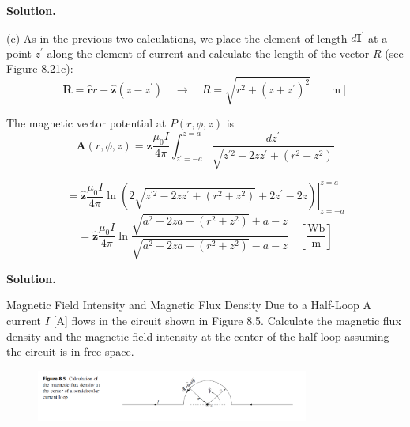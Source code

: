 \documentclass[12pt, a4paper, oneside]{report}
\newenvironment{solution}{
  \par\medskip\noindent
  \textbf{Solution.}\quad\itshape
  \par\noindent\makebox[\linewidth]{\rule{\textwidth}{0.4pt}}
}{
  \par\noindent\makebox[\linewidth]{\rule{\textwidth}{0.4pt}}
  \par\medskip
}
\begin{document}
\begin{solution}
(c) As in the previous two calculations, we place the element of length $d \mathbf{I}^{\prime}$ at a point $z^{\prime}$ along the element of current and calculate the length of the vector $R$ (see Figure 8.21c):
$$
\mathbf{R}=\hat{\mathbf{r}} r-\hat{\mathbf{z}}\left(z-z^{\prime}\right) \quad \rightarrow \quad R=\sqrt{r^2+\left(z+z^{\prime}\right)^2} \quad[\mathrm{~m}]
$$

The magnetic vector potential at $P(r, \phi, z)$ is
$$
\mathbf{A}(r, \phi, z) =\hat{\mathbf{z}} \frac{\mu_0 I}{4 \pi} \int_{z^{\prime}=-a}^{z=a} \frac{d z^{\prime}}{\sqrt{z^{\prime 2}-2 z z^{\prime}+\left(r^2+z^2\right)}}
$$

$$
 =\left.\hat{\mathbf{z}} \frac{\mu_0 I}{4 \pi} \ln \left(2 \sqrt{z^{\prime 2}-2 z z^{\prime}+\left(r^2+z^2\right)}+2 z^{\prime}-2 z\right)\right|_{z=-a} ^{z=a}
 $$
 $$
 =\hat{\mathbf{z}} \frac{\mu_0 I}{4 \pi} \ln \frac{\sqrt{a^2-2 z a+\left(r^2+z^2\right)}+a-z}{\sqrt{a^2+2 z a+\left(r^2+z^2\right)}-a-z} \quad\left[\frac{\mathrm{Wb}}{\mathrm{m}}\right]
$$
\end{solution}


\begin{solution}
Magnetic Field Intensity and Magnetic Flux Density Due to a Half-Loop A current $I$ [A] flows in the circuit shown in Figure 8.5. Calculate the magnetic flux density and the magnetic field intensity at the center of the half-loop assuming the circuit is in free space.
\end{solution}


\begin{figure}[ht!]
    \centering
    \includegraphics[width=0.8\textwidth]{15.png}
    \caption{}
    \label{fig:enter-label}
\end{figure}
\end{document}
